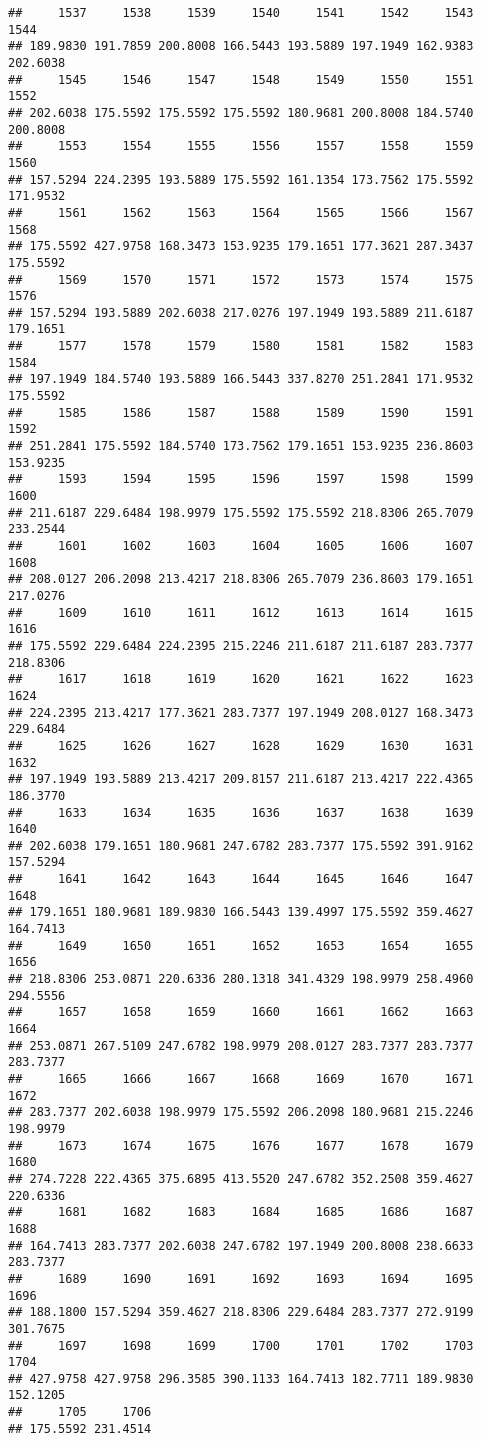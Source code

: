 \documentclass[
]{article}
\begin{document}
\begin{verbatim}
##     1537     1538     1539     1540     1541     1542     1543     1544 
## 189.9830 191.7859 200.8008 166.5443 193.5889 197.1949 162.9383 202.6038 
##     1545     1546     1547     1548     1549     1550     1551     1552 
## 202.6038 175.5592 175.5592 175.5592 180.9681 200.8008 184.5740 200.8008 
##     1553     1554     1555     1556     1557     1558     1559     1560 
## 157.5294 224.2395 193.5889 175.5592 161.1354 173.7562 175.5592 171.9532 
##     1561     1562     1563     1564     1565     1566     1567     1568 
## 175.5592 427.9758 168.3473 153.9235 179.1651 177.3621 287.3437 175.5592 
##     1569     1570     1571     1572     1573     1574     1575     1576 
## 157.5294 193.5889 202.6038 217.0276 197.1949 193.5889 211.6187 179.1651 
##     1577     1578     1579     1580     1581     1582     1583     1584 
## 197.1949 184.5740 193.5889 166.5443 337.8270 251.2841 171.9532 175.5592 
##     1585     1586     1587     1588     1589     1590     1591     1592 
## 251.2841 175.5592 184.5740 173.7562 179.1651 153.9235 236.8603 153.9235 
##     1593     1594     1595     1596     1597     1598     1599     1600 
## 211.6187 229.6484 198.9979 175.5592 175.5592 218.8306 265.7079 233.2544 
##     1601     1602     1603     1604     1605     1606     1607     1608 
## 208.0127 206.2098 213.4217 218.8306 265.7079 236.8603 179.1651 217.0276 
##     1609     1610     1611     1612     1613     1614     1615     1616 
## 175.5592 229.6484 224.2395 215.2246 211.6187 211.6187 283.7377 218.8306 
##     1617     1618     1619     1620     1621     1622     1623     1624 
## 224.2395 213.4217 177.3621 283.7377 197.1949 208.0127 168.3473 229.6484 
##     1625     1626     1627     1628     1629     1630     1631     1632 
## 197.1949 193.5889 213.4217 209.8157 211.6187 213.4217 222.4365 186.3770 
##     1633     1634     1635     1636     1637     1638     1639     1640 
## 202.6038 179.1651 180.9681 247.6782 283.7377 175.5592 391.9162 157.5294 
##     1641     1642     1643     1644     1645     1646     1647     1648 
## 179.1651 180.9681 189.9830 166.5443 139.4997 175.5592 359.4627 164.7413 
##     1649     1650     1651     1652     1653     1654     1655     1656 
## 218.8306 253.0871 220.6336 280.1318 341.4329 198.9979 258.4960 294.5556 
##     1657     1658     1659     1660     1661     1662     1663     1664 
## 253.0871 267.5109 247.6782 198.9979 208.0127 283.7377 283.7377 283.7377 
##     1665     1666     1667     1668     1669     1670     1671     1672 
## 283.7377 202.6038 198.9979 175.5592 206.2098 180.9681 215.2246 198.9979 
##     1673     1674     1675     1676     1677     1678     1679     1680 
## 274.7228 222.4365 375.6895 413.5520 247.6782 352.2508 359.4627 220.6336 
##     1681     1682     1683     1684     1685     1686     1687     1688 
## 164.7413 283.7377 202.6038 247.6782 197.1949 200.8008 238.6633 283.7377 
##     1689     1690     1691     1692     1693     1694     1695     1696 
## 188.1800 157.5294 359.4627 218.8306 229.6484 283.7377 272.9199 301.7675 
##     1697     1698     1699     1700     1701     1702     1703     1704 
## 427.9758 427.9758 296.3585 390.1133 164.7413 182.7711 189.9830 152.1205 
##     1705     1706 
## 175.5592 231.4514
\end{verbatim}
\end{document}
